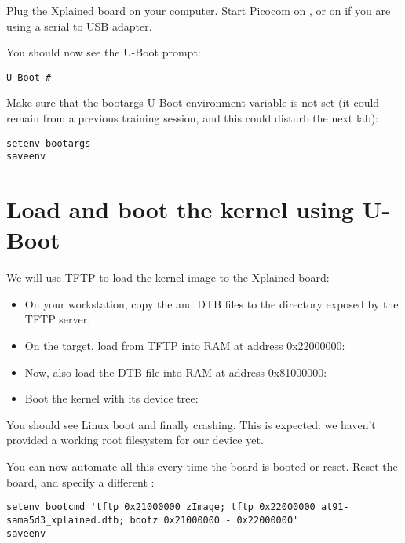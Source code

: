 Plug the Xplained board on your computer. Start Picocom on
, or on  if you are using a serial
to USB adapter.

You should now see the U-Boot prompt:

\begin{verbatim}
U-Boot #
\end{verbatim}

Make sure that the bootargs U-Boot environment variable is not set (it
could remain from a previous training session, and this could disturb
the next lab):

\begin{verbatim}
setenv bootargs
saveenv
\end{verbatim}

\section{Load and boot the kernel using U-Boot}

We will use TFTP to load the kernel image to the Xplained board:

\begin{itemize}

\item On your workstation, copy the  and DTB files to the
  directory exposed by the TFTP server.

\item On the target, load  from TFTP into RAM at address
  0x22000000:\\

\item Now, also load the DTB file into RAM at address 0x81000000:\\

\item Boot the kernel with its device tree:\\

\end{itemize}

You should see Linux boot and finally crashing. This is expected: we
haven't provided a working root filesystem for our device yet.

You can now automate all this every time the board is booted or
reset. Reset the board, and specify a different :

{\scriptsize
\begin{verbatim}
setenv bootcmd 'tftp 0x21000000 zImage; tftp 0x22000000 at91-sama5d3_xplained.dtb; bootz 0x21000000 - 0x22000000'
saveenv
\end{verbatim}
}

